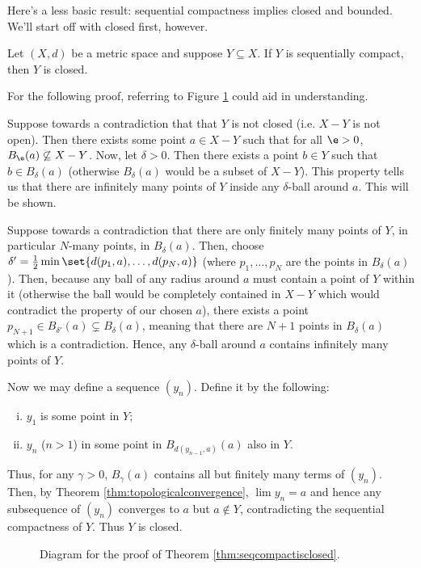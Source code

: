 \documentclass[class=article, crop=false]{standalone}
\begin{document}
Here's a less basic result: sequential compactness implies closed and bounded. We'll start off with closed first, however.
\begin{thm}{\label{thm:seqcompactisclosed}}
    Let $(X,d)$ be a metric space and suppose $Y \subseteq X$. If $Y$ is sequentially compact, then $Y$ is closed.
\end{thm}
For the following proof, referring to Figure \ref{fig:seqcompactisclosed} could aid in understanding.
\begin{pf}
    Suppose towards a contradiction that that $Y$ is not closed (i.e. $X-Y$ is not open). Then there exists some point $a \in X-Y$ such that for all $\e > 0$, $B_\e(a) \not \subseteq X-Y$. Now, let $\delta > 0$. Then there exists a point $b \in Y$ such that $b \in B_\delta(a)$ (otherwise $B_\delta(a)$ would be a subset of $X-Y$). This property tells us that there are infinitely many points of $Y$ inside any $\delta$-ball around $a$. This will be shown.

    Suppose towards a contradiction that there are only finitely many points of $Y$, in particular $N$-many points, in $B_\delta(a)$. Then, choose $\delta' = \frac{1}{2} \min \set{d(p_1,a), \ldots, d(p_N,a)}$ (where $p_1, \ldots, p_N$ are the points in $B_\delta(a)$). Then, because any ball of any radius around $a$ must contain a point of $Y$ within it (otherwise the ball would be completely contained in $X-Y$ which would contradict the property of our chosen $a$), there exists a point $p_{N+1} \in B_{\delta'}(a) \subsetneq B_\delta(a)$, meaning that there are $N+1$ points in $B_\delta(a)$
    which is a contradiction. Hence, any $\delta$-ball around $a$ contains infinitely many points of $Y$.

    Now we may define a sequence $(y_n)$. Define it by the following:
        \begin{enumerate}[(i)]
            \item $y_1$ is some point in $Y$;
            \item $y_n$ ($n > 1$) in some point in $B_{d(y_{n-1},a)}(a)$ also in $Y$.
        \end{enumerate}
    Thus, for any $\gamma > 0$, $B_\gamma(a)$ contains all but finitely many terms of $(y_n)$. Then, by Theorem \ref{thm:topologicalconvergence}, $\lim y_n = a$ and hence any subsequence of $(y_n)$ converges to $a$ but $a \not \in Y$, contradicting the sequential compactness of $Y$. Thus $Y$ is closed.
\end{pf}

\begin{figure}[ht]
    \centering
    \caption{Diagram for the proof of Theorem \ref{thm:seqcompactisclosed}.}
    \label{fig:seqcompactisclosed}
\end{figure}
\end{document}
